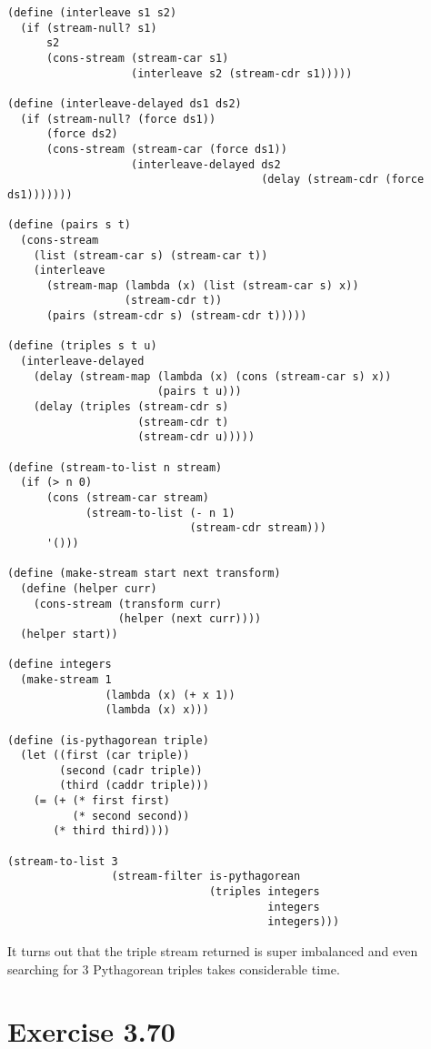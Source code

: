 \documentclass[../main.tex]{subfiles}
\begin{document}
\begin{lstlisting}
(define (interleave s1 s2)
  (if (stream-null? s1)
      s2
      (cons-stream (stream-car s1)
                   (interleave s2 (stream-cdr s1)))))

(define (interleave-delayed ds1 ds2)
  (if (stream-null? (force ds1))
      (force ds2)
      (cons-stream (stream-car (force ds1))
                   (interleave-delayed ds2
                                       (delay (stream-cdr (force ds1)))))))

(define (pairs s t)
  (cons-stream
    (list (stream-car s) (stream-car t))
    (interleave
      (stream-map (lambda (x) (list (stream-car s) x))
                  (stream-cdr t))
      (pairs (stream-cdr s) (stream-cdr t)))))

(define (triples s t u)
  (interleave-delayed
    (delay (stream-map (lambda (x) (cons (stream-car s) x))
                       (pairs t u)))
    (delay (triples (stream-cdr s)
                    (stream-cdr t)
                    (stream-cdr u)))))

(define (stream-to-list n stream)
  (if (> n 0)
      (cons (stream-car stream)
            (stream-to-list (- n 1)
                            (stream-cdr stream)))
      '()))

(define (make-stream start next transform)
  (define (helper curr)
    (cons-stream (transform curr)
                 (helper (next curr))))
  (helper start))

(define integers
  (make-stream 1
               (lambda (x) (+ x 1))
               (lambda (x) x)))

(define (is-pythagorean triple)
  (let ((first (car triple))
        (second (cadr triple))
        (third (caddr triple)))
    (= (+ (* first first)
          (* second second))
       (* third third))))

(stream-to-list 3
                (stream-filter is-pythagorean
                               (triples integers
                                        integers
                                        integers)))
\end{lstlisting}

It turns out that the triple stream returned is super imbalanced and even searching for 3 Pythagorean triples takes considerable time.

\section{Exercise 3.70}
\end{document}

